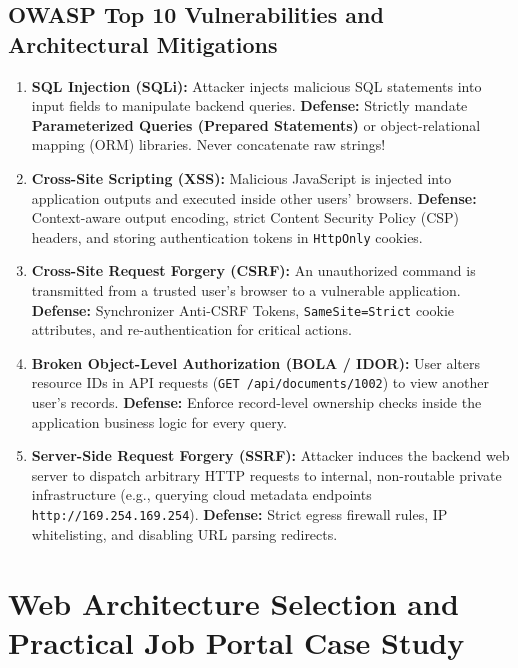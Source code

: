 \subsection{OWASP Top 10 Vulnerabilities and Architectural Mitigations}
\begin{enumerate}
    \item \textbf{SQL Injection (SQLi):} Attacker injects malicious SQL statements into input fields to manipulate backend queries. \textbf{Defense:} Strictly mandate \textbf{Parameterized Queries (Prepared Statements)} or object-relational mapping (ORM) libraries. Never concatenate raw strings!
    \item \textbf{Cross-Site Scripting (XSS):} Malicious JavaScript is injected into application outputs and executed inside other users' browsers. \textbf{Defense:} Context-aware output encoding, strict Content Security Policy (CSP) headers, and storing authentication tokens in \texttt{HttpOnly} cookies.
    \item \textbf{Cross-Site Request Forgery (CSRF):} An unauthorized command is transmitted from a trusted user's browser to a vulnerable application. \textbf{Defense:} Synchronizer Anti-CSRF Tokens, \texttt{SameSite=Strict} cookie attributes, and re-authentication for critical actions.
    \item \textbf{Broken Object-Level Authorization (BOLA / IDOR):} User alters resource IDs in API requests (\texttt{GET /api/documents/1002}) to view another user's records. \textbf{Defense:} Enforce record-level ownership checks inside the application business logic for every query.
    \item \textbf{Server-Side Request Forgery (SSRF):} Attacker induces the backend web server to dispatch arbitrary HTTP requests to internal, non-routable private infrastructure (e.g., querying cloud metadata endpoints \texttt{http://169.254.169.254}). \textbf{Defense:} Strict egress firewall rules, IP whitelisting, and disabling URL parsing redirects.
\end{enumerate}

\section{Web Architecture Selection and Practical Job Portal Case Study}
\label{sec:se_case_study}

